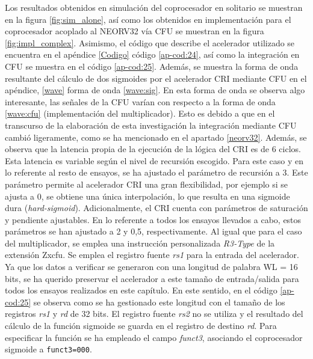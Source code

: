 Los resultados obtenidos en simulación del coprocesador en solitario se muestran en la figura \ref{fig:sim_alone}, así como los obtenidos en implementación para el coprocesador acoplado al NEORV32 vía CFU se muestran en la figura \ref{fig:impl_complex}.
Asimismo, el código que describe el acelerador utilizado se encuentra en el apéndice \ref{Codigo} código \ref{ap-cod:24}, así como la integración en CFU se muestra en el código \ref{ap-cod:25}.
Además, se muestra la forma de onda resultante del cálculo de dos sigmoides por el acelerador CRI mediante CFU en el apéndice, \ref{wave} forma de onda \ref{wave:sig}. 
En esta forma de onda se observa algo interesante, las señales de la CFU varían con respecto a la forma de onda \ref{wave:cfu} (implementación del multiplicador).
Esto es debido a que en el transcurso de la elaboración de esta investigación la integración mediante CFU cambió ligeramente, como se ha mencionado en el apartado \ref{neorv32}.
Además, se observa que la latencia propia de la ejecución de la lógica del CRI es de 6 ciclos.
Esta latencia es variable según el nivel de recursión escogido.
Para este caso y en lo referente al resto de ensayos, se ha ajustado el parámetro de recursión  a 3.
Este parámetro permite al acelerador CRI una gran flexibilidad, por ejemplo si se ajusta a 0, se obtiene una única interpolación, lo que resulta en una sigmoide dura (\textit{hard-sigmoid}).
Adicionalmente, el CRI cuenta con parámetros de saturación y pendiente ajustables.
En lo referente a todos los ensayos llevados a cabo, estos parámetros se han ajustado a 2 y 0,5, respectivamente.
Al igual que para el caso del multiplicador, se emplea una instrucción personalizada \textit{R3-Type} de la extensión Zxcfu.
Se emplea el registro fuente \textit{rs1} para la entrada del acelerador.
Ya que los datos a verificar se generaron con una longitud de palabra WL = 16 bits, se ha querido preservar el acelerador a este tamaño de entrada/salida para todos los ensayos realizados en este capítulo.
En este sentido, en el código \ref{ap-cod:25} se observa como se ha gestionado este longitud con el tamaño de los registros \textit{rs1} y \textit{rd} de 32 bits. 
El registro fuente \textit{rs2} no se utiliza y el resultado del cálculo de la función sigmoide se guarda en el registro de destino \textit{rd}.
Para especificar la función se ha empleado el campo \textit{funct3}, asociando el coprocesador sigmoide a \texttt{funct3=000}.

